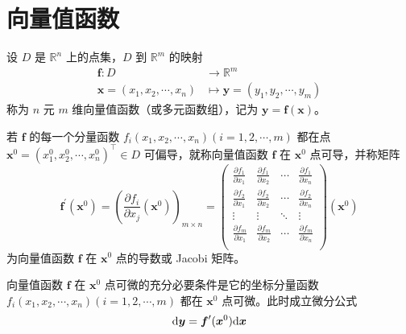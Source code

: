 \documentclass{ctexbook}
\def\diff{\textnormal{d}}
\begin{document}
\section{向量值函数}

\begin{definition}[向量值函数]
    设 $D$ 是 $\mathbb{R}^n$ 上的点集，$D$ 到 $\mathbb{R}^m$ 的映射
    \begin{equation}
        \begin{aligned}
            \boldsymbol{f}:D&\rightarrow\mathbb{R}^m\\
            \boldsymbol{x}=(x_1,x_2,\cdots,x_n)&\mapsto \boldsymbol{y}=(y_1,y_2,\cdots,y_m)
        \end{aligned}
    \end{equation}
    称为 $n$ 元 $m$ 维向量值函数（或多元函数组），记为 $\boldsymbol{y}=\boldsymbol{f}(\boldsymbol{x})$。
\end{definition}

\begin{definition}[向量值函数的导数]
    若 $\boldsymbol{f}$ 的每一个分量函数 $f_i(x_1,x_2,\cdots,x_n)(i=1,2,\cdots,m)$ 都在点 $\boldsymbol{x}^0=(x_1^0,x_2^0,\cdots,x_n^0)^\top\in D$ 可偏导，就称向量值函数 $\boldsymbol{f}$ 在 $\boldsymbol{x}^0$ 点可导，并称矩阵
    \begin{equation}
        \boldsymbol{f}^\prime(\boldsymbol{x}^0)=\left(\frac{\partial f_i}{\partial x_j}(\boldsymbol{x}^0)\right)_{m\times n}=\begin{pmatrix}
            \frac{\partial f_1}{\partial x_1} & \frac{\partial f_1}{\partial x_2} & \cdots & \frac{\partial f_1}{\partial x_n} \\
            \frac{\partial f_2}{\partial x_1} & \frac{\partial f_2}{\partial x_2} & \cdots & \frac{\partial f_2}{\partial x_n} \\
            \vdots & \vdots & \ddots & \vdots \\
            \frac{\partial f_m}{\partial x_1} & \frac{\partial f_m}{\partial x_2} & \cdots & \frac{\partial f_m}{\partial x_n} \\
        \end{pmatrix}\left(\boldsymbol{x}^0\right)
    \end{equation}
    为向量值函数 $\boldsymbol{f}$ 在 $\boldsymbol{x}^0$ 点的导数或 Jacobi 矩阵。
\end{definition}

\begin{theorem}[向量值函数的微分公式]
    向量值函数 $\boldsymbol{f}$ 在 $\boldsymbol{x}^0$ 点可微的充分必要条件是它的坐标分量函数 $f_i(x_1,x_2,\cdots,x_n)(i=1,2,\cdots,m)$ 都在 $\boldsymbol{x}^0$ 点可微。此时成立微分公式
    \begin{equation}
        \diff\boldsymbol{y}=\boldsymbol{f}^\prime(\boldsymbol{x}^0)\diff \boldsymbol{x}
    \end{equation}
\end{theorem}
\end{document}
